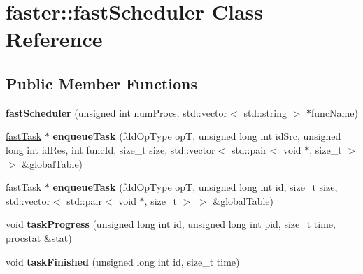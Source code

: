 \hypertarget{classfaster_1_1fastScheduler}{}\section{faster\+:\+:fast\+Scheduler Class Reference}
\label{classfaster_1_1fastScheduler}
\subsection*{Public Member Functions}
\begin{DoxyCompactItemize}
\item 
\hypertarget{classfaster_1_1fastScheduler_a5585b9363737823bf17e6782013b04a8}{}{\bfseries fast\+Scheduler} (unsigned int num\+Procs, std\+::vector$<$ std\+::string $>$ $\ast$func\+Name)\label{classfaster_1_1fastScheduler_a5585b9363737823bf17e6782013b04a8}

\item 
\hypertarget{classfaster_1_1fastScheduler_ab388ad86da72e45e0dd0ffa94890eb76}{}\hyperlink{classfaster_1_1fastTask}{fast\+Task} $\ast$ {\bfseries enqueue\+Task} (fdd\+Op\+Type op\+T, unsigned long int id\+Src, unsigned long int id\+Res, int func\+Id, size\+\_\+t size, std\+::vector$<$ std\+::pair$<$ void $\ast$, size\+\_\+t $>$ $>$ \&global\+Table)\label{classfaster_1_1fastScheduler_ab388ad86da72e45e0dd0ffa94890eb76}

\item 
\hypertarget{classfaster_1_1fastScheduler_a624be5f3699d56e5d865537b9c339ee4}{}\hyperlink{classfaster_1_1fastTask}{fast\+Task} $\ast$ {\bfseries enqueue\+Task} (fdd\+Op\+Type op\+T, unsigned long int id, size\+\_\+t size, std\+::vector$<$ std\+::pair$<$ void $\ast$, size\+\_\+t $>$ $>$ \&global\+Table)\label{classfaster_1_1fastScheduler_a624be5f3699d56e5d865537b9c339ee4}

\item 
\hypertarget{classfaster_1_1fastScheduler_a09db7fd6c9076e26dea68a7c925bf531}{}void {\bfseries task\+Progress} (unsigned long int id, unsigned long int pid, size\+\_\+t time, \hyperlink{classfaster_1_1procstat}{procstat} \&stat)\label{classfaster_1_1fastScheduler_a09db7fd6c9076e26dea68a7c925bf531}

\item 
\hypertarget{classfaster_1_1fastScheduler_af657bff84b9c117625135ca0c8f4ccf6}{}void {\bfseries task\+Finished} (unsigned long int id, size\+\_\+t time)\label{classfaster_1_1fastScheduler_af657bff84b9c117625135ca0c8f4ccf6}


\end{DoxyCompactItemize}
